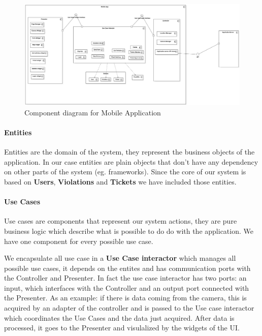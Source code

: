 \begin{figure}
\centering
\includegraphics[width=\textwidth]{Images/COMP-MOBILE.png}
\caption{\label{fig:compdiag1} Component diagram for Mobile Application}
\end{figure}

\paragraph{Entities}
Entities are the domain of the system, they represent the business objects of the application. In our case entities are plain objects that don't have any dependency on other parts of the system (eg. frameworks).
Since the core of our system is based on \textbf{Users}, \textbf{Violations} and \textbf{Tickets} we have included those entities.

\paragraph{Use Cases}
Use cases are components that represent our system actions, they are pure business logic which describe what is possible to do do with the application. We have one component for every possible use case.

We encapsulate all use case in a \textbf{Use Case interactor} which manages all possible use cases, it depends on the entites and has communication ports with the Controller and Presenter.
In fact the use case interactor has two ports: an input, which interfaces with the Controller and an output port connected with the Presenter. As an example: if there is data coming from the camera, this is acquired by an adapter of the controller and is passed to the Use case interactor which coordinates the Use Cases and the data just acquired. After data is processed, it goes to the Presenter and visulalized by the widgets of the UI.

